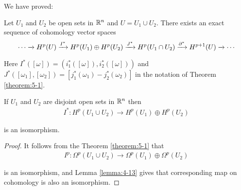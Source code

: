 We have proved:

\begin{theorem}\label{theorem:5-2}
Let $U_1$ and $U_2$ be open sets in ${\mathbb{R}}^n$ and $U = U_1\cup U_2$.
There exists an exact sequence of cohomology vector spaces
\begin{align*}
  \cdots\xra[]H^p(U)\xra[I^*]H^p(U_1)\oplus H^p(U_2)\xra[J^*]H^p(U_1\cap U_2)\xra[\partial^*]H^{p+1}(U)\xra[]\cdots
\end{align*}

Here $I^*([\omega]) = (i^*_1([\omega]), i^*_2([\omega]))$ and $J^*([\omega_1], [\omega_2]) = [j^*_1(\omega_1) - j^*_2(\omega_2)]$
in the notation of Theorem \ref{theorem:5-1}.
\end{theorem}

\begin{corollary}\label{corollary:5-3}
  If $U_1$ and $U_2$ are disjoint open sets in ${\mathbb{R}}^n$ then
  \begin{align*}
    I^*:H^p(U_1\cup U_2)\to H^p(U_1)\oplus H^p(U_2)
  \end{align*}

  is an isomorphism.
\end{corollary}

\begin{proof}
  It follows from the Theorem \ref{theorem:5-1} that 
  \begin{align*}
    I^p:\Omega^p(U_1\cup U_2)\to\Omega^p(U_1)\oplus\Omega^p(U_2)
  \end{align*}

  is an isomorphism, and Lemma \ref{lemma:4-13} gives that corresponding map on cohomology is also an isomorphism.
\end{proof}

